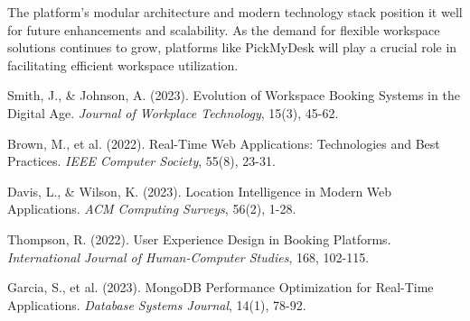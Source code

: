 \documentclass[12pt,a4paper]{article}
\begin{document}
The platform's modular architecture and modern technology stack position it well for future enhancements and scalability. As the demand for flexible workspace solutions continues to grow, platforms like PickMyDesk will play a crucial role in facilitating efficient workspace utilization.

\begin{thebibliography}{9}

Smith, J., \& Johnson, A. (2023). Evolution of Workspace Booking Systems in the Digital Age. \textit{Journal of Workplace Technology}, 15(3), 45-62.

Brown, M., et al. (2022). Real-Time Web Applications: Technologies and Best Practices. \textit{IEEE Computer Society}, 55(8), 23-31.

Davis, L., \& Wilson, K. (2023). Location Intelligence in Modern Web Applications. \textit{ACM Computing Surveys}, 56(2), 1-28.

Thompson, R. (2022). User Experience Design in Booking Platforms. \textit{International Journal of Human-Computer Studies}, 168, 102-115.

Garcia, S., et al. (2023). MongoDB Performance Optimization for Real-Time Applications. \textit{Database Systems Journal}, 14(1), 78-92.

\end{thebibliography}
\end{document}
